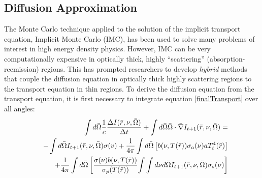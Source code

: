 \belowSubSecSkip

\subsection{Diffusion Approximation}
\label{sec:Transport-Diffusion-Approximation}

\noindent
	\indent The Monte Carlo technique applied to the solution of the implicit transport equation, Implicit Monte Carlo (IMC), has been used to solve many problems of interest in high energy density physics. However, IMC can be very computationally expensive in optically thick, highly ``scattering'' (absorption-reemission) regions. This has prompted researchers to develop {\it hybrid} methods that couple the diffusion equation in optically thick highly scattering regions to the transport equation in thin regions. To derive the diffusion equation from the transport equation, it is first necessary to integrate equation \ref{finalTransport} over all angles: 
	\begin{eqnarray}
	\label{diffusion1}
	& &\int{d\bar{\Omega}}{1\over{c}}{\Delta{I(\bar{r},\nu,\bar{\Omega})}\over{\Delta{t}}} + \int{d\bar{\Omega}}\bar{\Omega}\cdot\bar{\nabla}{I_{t+1}(\bar{r},\nu,\bar{\Omega})}=\nonumber \\& & -\int{d\bar{\Omega}}I_{t+1}(\bar{r},\nu,\bar{\Omega})\sigma(v)+{1\over{4\pi}}\int{d\bar{\Omega}}\left[b(\nu,T(\bar{r}))\sigma_a(\nu) aT_t^4(\bar{r})\right]\nonumber \\& & +{1\over{4\pi}}\int{d\bar{\Omega}}\left[{\sigma(\nu)b(\nu,T(\bar{r}))\over{\sigma_p(T(\bar{r}))}}{\int\int{d\nu}{d\bar{\Omega}}I_{t+1}(\bar{r},\nu,\bar{\Omega})\sigma_s(\nu)}\right]
	\end{eqnarray}
	
